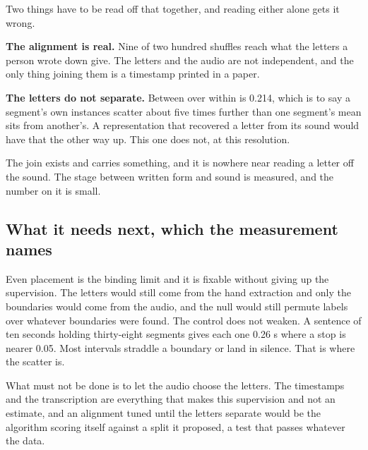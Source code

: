 Two things have to be read off that together, and reading either alone gets it wrong.

\textbf{The alignment is real.} Nine of two hundred shuffles reach what the letters a person wrote
down give. The letters and the audio are not independent, and the only thing joining them is a
timestamp printed in a paper.

\textbf{The letters do not separate.} Between over within is 0.214, which is to say a segment's own
instances scatter about five times further than one segment's mean sits from another's. A
representation that recovered a letter from its sound would have that the other way up. This one does
not, at this resolution.

The join exists and carries something, and it is nowhere near reading a letter off the sound. The
stage between written form and sound is measured, and the number on it is small.

\subsection{What it needs next, which the measurement names}

Even placement is the binding limit and it is fixable without giving up the supervision. The letters
would still come from the hand extraction and only the boundaries would come from the audio, and the
null would still permute labels over whatever boundaries were found. The control does not weaken. A
sentence of ten seconds holding thirty-eight segments gives each one 0.26 s where a stop is nearer
0.05. Most intervals straddle a boundary or land in silence. That is where the scatter is.

What must not be done is to let the audio choose the letters. The timestamps and the transcription are
everything that makes this supervision and not an estimate, and an alignment tuned until the letters
separate would be the algorithm scoring itself against a split it proposed, a test that passes
whatever the data.
